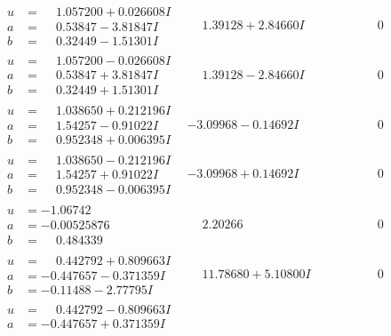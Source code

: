 \documentclass[1p]{elsarticle_modified}
\theoremstyle{definition}
\begin{document}
$$\begin{array}{c|c|c}
\begin{aligned}
u &= \phantom{-}1.057200 + 0.026608 I \\
a &= \phantom{-}0.53847 - 3.81847 I \\
b &= \phantom{-}0.32449 - 1.51301 I\end{aligned}
 & \phantom{-}1.39128 + 2.84660 I & \phantom{-0.000000 } 0 \\ \hline\begin{aligned}
u &= \phantom{-}1.057200 - 0.026608 I \\
a &= \phantom{-}0.53847 + 3.81847 I \\
b &= \phantom{-}0.32449 + 1.51301 I\end{aligned}
 & \phantom{-}1.39128 - 2.84660 I & \phantom{-0.000000 } 0 \\ \hline\begin{aligned}
u &= \phantom{-}1.038650 + 0.212196 I \\
a &= \phantom{-}1.54257 - 0.91022 I \\
b &= \phantom{-}0.952348 + 0.006395 I\end{aligned}
 & -3.09968 - 0.14692 I & \phantom{-0.000000 } 0 \\ \hline\begin{aligned}
u &= \phantom{-}1.038650 - 0.212196 I \\
a &= \phantom{-}1.54257 + 0.91022 I \\
b &= \phantom{-}0.952348 - 0.006395 I\end{aligned}
 & -3.09968 + 0.14692 I & \phantom{-0.000000 } 0 \\ \hline\begin{aligned}
u &= -1.06742\phantom{ +0.000000I} \\
a &= -0.00525876\phantom{ +0.000000I} \\
b &= \phantom{-}0.484339\phantom{ +0.000000I}\end{aligned}
 & \phantom{-}2.20266\phantom{ +0.000000I} & \phantom{-0.000000 } 0 \\ \hline\begin{aligned}
u &= \phantom{-}0.442792 + 0.809663 I \\
a &= -0.447657 - 0.371359 I \\
b &= -0.11488 - 2.77795 I\end{aligned}
 & \phantom{-}11.78680 + 5.10800 I & \phantom{-0.000000 } 0 \\ \hline\begin{aligned}
u &= \phantom{-}0.442792 - 0.809663 I \\
a &= -0.447657 + 0.371359 I \\

\end{aligned}
\end{array}$$
\end{document}
